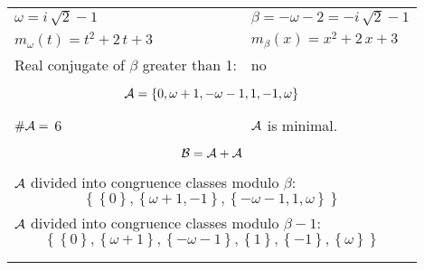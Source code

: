 \begin{exmp}
\label{ex:compareAL}


\rule{0cm}{0cm}

\begin{tabular}{ll}
$\omega=  i \, \sqrt{2} - 1 $  & $\beta= -\omega - 2 = -i \, \sqrt{2} - 1 $\\
$m_\omega(t)=  t^{2} + 2 \, t + 3 $  & $m_\beta(x)=  x^{2} + 2 \, x + 3 $\\
Real conjugate of $\beta$ greater than 1:   &  no \\ \hline
\multicolumn{2}{l}{\begin{minipage}{\textwidth}\begin{dmath*}\A = \left\{0, \omega + 1, -\omega - 1, 1, -1, \omega\right\}  \end{dmath*}\end{minipage} }\\
$\#\mathcal{A}= $ 6 $ $ & $\mathcal{A}$ is minimal. \\
\multicolumn{2}{l}{\begin{minipage}{\textwidth}\begin{dmath*}\B =\A+\A \end{dmath*}\end{minipage} }\\[10pt]
\multicolumn{2}{l}{\begin{minipage}{\textwidth}$\mathcal{A}$ divided into congruence classes modulo $\beta$: \begin{dmath*} \left\{\left\{0\right\}, \left\{\omega + 1, -1\right\}, \left\{-\omega - 1, 1, \omega\right\}\right\}  \end{dmath*}\end{minipage} }\\[10pt]
\multicolumn{2}{l}{\begin{minipage}{\textwidth}$\mathcal{A}$ divided into congruence classes modulo $\beta-1$: \begin{dmath*} \left\{\left\{0\right\}, \left\{\omega + 1\right\}, \left\{-\omega - 1\right\}, \left\{1\right\}, \left\{-1\right\}, \left\{\omega\right\}\right\}  \end{dmath*}\end{minipage} }\\
 & \\ \hline
 & \\
\end{tabular}


\end{exmp}
